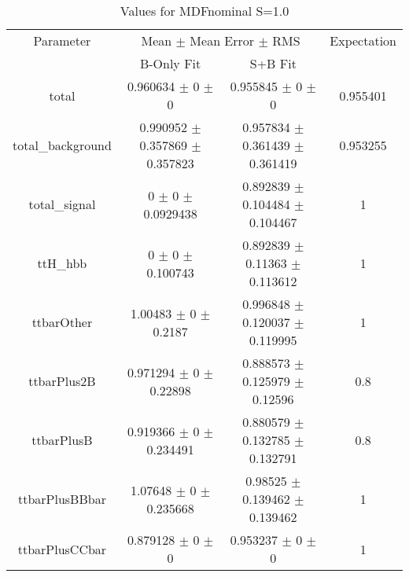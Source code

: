 \begin{table}
\centering
\caption{Values for MDFnominal S=1.0}
\begin{tabular}{cccc}
\toprule
Parameter & \multicolumn{2}{c}{Mean $\pm$ Mean Error $\pm$ RMS} & Expectation\\
 & B-Only Fit & S+B Fit & \\
\midrule
total & \num{0.960634} $\pm$ \num{0} $\pm$ \num{0} & \num{0.955845} $\pm$ \num{0} $\pm$ \num{0} & \num{0.955401}\\
total\_background & \num{0.990952} $\pm$ \num{0.357869} $\pm$ \num{0.357823} & \num{0.957834} $\pm$ \num{0.361439} $\pm$ \num{0.361419} & \num{0.953255}\\
total\_signal & \num{0} $\pm$ \num{0} $\pm$ \num{0.0929438} & \num{0.892839} $\pm$ \num{0.104484} $\pm$ \num{0.104467} & \num{1}\\
ttH\_hbb & \num{0} $\pm$ \num{0} $\pm$ \num{0.100743} & \num{0.892839} $\pm$ \num{0.11363} $\pm$ \num{0.113612} & \num{1}\\
ttbarOther & \num{1.00483} $\pm$ \num{0} $\pm$ \num{0.2187} & \num{0.996848} $\pm$ \num{0.120037} $\pm$ \num{0.119995} & \num{1}\\
ttbarPlus2B & \num{0.971294} $\pm$ \num{0} $\pm$ \num{0.22898} & \num{0.888573} $\pm$ \num{0.125979} $\pm$ \num{0.12596} & \num{0.8}\\
ttbarPlusB & \num{0.919366} $\pm$ \num{0} $\pm$ \num{0.234491} & \num{0.880579} $\pm$ \num{0.132785} $\pm$ \num{0.132791} & \num{0.8}\\
ttbarPlusBBbar & \num{1.07648} $\pm$ \num{0} $\pm$ \num{0.235668} & \num{0.98525} $\pm$ \num{0.139462} $\pm$ \num{0.139462} & \num{1}\\
ttbarPlusCCbar & \num{0.879128} $\pm$ \num{0} $\pm$ \num{0} & \num{0.953237} $\pm$ \num{0} $\pm$ \num{0} & \num{1}\\
\bottomrule
\end{tabular}
\end{table}